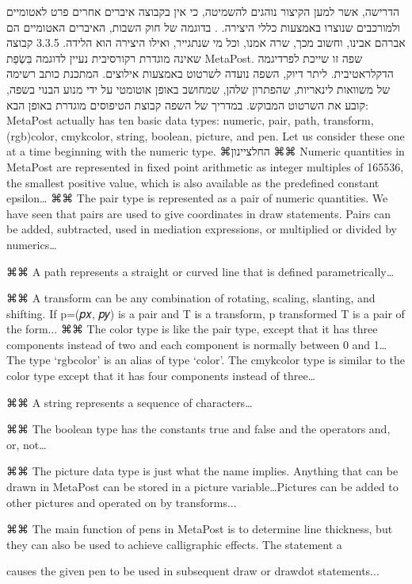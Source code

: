 הדרישה, אשר למען הקיצור נוהגים להשמיטה, כי אין בקבוצה איברים אחרים פרט לאטומיים ולמורכבים שנוצרו באמצעות כללי היצירה. .
בדוגמה של חוק השבות, האיברים האטומיים הם אברהם אבינו, וחשוב מכך, שרה אמנו, וכל מי שנתגייר, ואילו היצירה הוא הלידה.
​3.3.5​ קבוצה שאינה מוגדרת רקורסיבית
נעיין לדוגמה בִּשְׂפַת MetaPost. שפה זו שייכת לפרדיגמה הדקלראטיבית. ליתר דיוק, השפה נועדה לשרטוט באמצעות אילוצים. המתכנת כותב רשימה של משוואות לינאריות, שהפתרון שלהן, שמחושב באופן אוטומטי על ידי מנוע הבנוי בשפה, קובע את השרטוט המבוקש.
 במדריך של השפה קבוצת הטיפוסים מוגדרת באופן הבא:
MetaPost actually has ten basic data types: numeric, pair, path, transform, (rgb)color, cmykcolor, string, boolean, picture, and pen. Let us consider these one at a time beginning with the numeric type.
⌘החל{ציינון}
⌘⌘ Numeric quantities in MetaPost are represented in fixed point arithmetic as
integer multiples of 165536, the smallest positive value, which is also
available as the predefined constant epsilon…
⌘⌘
The pair type is represented as a pair of numeric quantities. We have seen that pairs are used to give coordinates in draw statements. Pairs can be added, subtracted, used in mediation expressions, or multiplied or divided by numerics…

⌘⌘ A path represents a straight or curved line that is defined parametrically…

⌘⌘ A transform can be any combination of rotating, scaling, slanting, and
shifting. If p=(𝑝𝑥, 𝑝𝑦) is a pair and T is a transform, p transformed T
is a pair of the form...
⌘⌘ The color type is like the pair type, except that it has three components
instead of two and each component is normally between 0 and 1…The type
‘rgbcolor’ is an alias of type ‘color’. The cmykcolor type is similar to the
color type except that it has four components instead of three…

⌘⌘ A string represents a sequence of characters…

⌘⌘ The boolean type has the constants true and false and the operators and, or,
not…

⌘⌘ The picture data type is just what the name implies. Anything that can be
drawn in MetaPost can be stored in a picture variable…Pictures can be added to
other pictures and operated on by transforms...

⌘⌘ The main function of pens in MetaPost is to determine line thickness, but
they can also be used to achieve calligraphic effects. The statement a


 causes the given pen to be used
in subsequent draw or drawdot statements...

